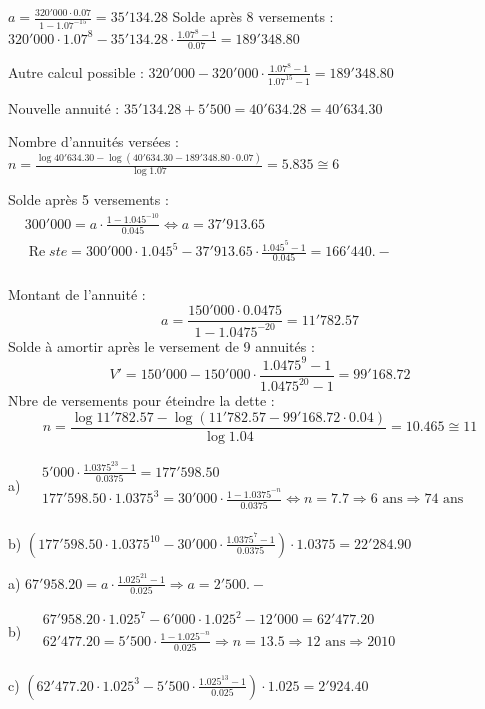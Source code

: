\begin{solution}
$a=\frac{320'000\cdot 0.07}{1-{{1.07}^{-15}}}=35'134.28$
		Solde après 8 versements : $320'000\cdot {{1.07}^{8}}-35'134.28\cdot \frac{{{1.07}^{8}}-1}{0.07}=189'348.80$
		
Autre calcul possible : $320'000-320'000\cdot \frac{{{1.07}^{8}}-1}{{{1.07}^{15}}-1}=189'348.80$
		
Nouvelle annuité : $35'134.28+5'500=40'634.28=40'634.30$
		
Nombre d’annuités versées : 
$n=\frac{\log 40'634.30-\log \left( 40'634.30-189'348.80\cdot 0.07 \right)}{\log 1.07}=5.835\cong 6$
\end{solution}

\begin{solution}
Solde après 5 versements : $\begin{array}{ll}
  & 300'000=a\cdot \frac{1-{{1.045}^{-10}}}{0.045}\Leftrightarrow a=37'913.65 \\ 
 & \operatorname{Re}ste=300'000\cdot {{1.045}^{5}}-37'913.65\cdot \frac{{{1.045}^{5}}-1}{0.045}=166'440.- \\ 
\end{array}$
\end{solution}

\begin{solution}
Montant de l’annuité : \[a=\frac{150'000\cdot 0.0475}{1-{{1.0475}^{-20}}}=11'782.57\]
Solde à amortir après le versement de 9 annuités : \[{V}'=150'000-150'000\cdot \frac{{{1.0475}^{9}}-1}{{{1.0475}^{20}}-1}=99'168.72\]
Nbre de versements pour éteindre la dette : \[n=\frac{\log 11'782.57-\log \left( 11'782.57-99'168.72\cdot 0.04 \right)}{\log 1.04}=10.465\cong 11\]
\end{solution}

\begin{solution}
a)	$\begin{array}{ll}
  & 5'000\cdot \frac{{{1.0375}^{23}}-1}{0.0375}=177'598.50 \\ 
 & 177'598.50\cdot {{1.0375}^{3}}=30'000\cdot \frac{1-{{1.0375}^{-n}}}{0.0375}\Leftrightarrow n=7.7\Rightarrow 6\text{ ans}\Rightarrow \text{74 ans} \\ 
\end{array}$

b) 	$\left( 177'598.50\cdot {{1.0375}^{10}}-30'000\cdot \frac{{{1.0375}^{7}}-1}{0.0375} \right)\cdot 1.0375=22'284.90$
\end{solution}

\begin{solution}
a)	$67'958.20=a\cdot \frac{{{1.025}^{21}}-1}{0.025}\Rightarrow a=2'500.-$

b)	$\begin{array}{ll}
  & 67'958.20\cdot {{1.025}^{7}}-6'000\cdot {{1.025}^{2}}-12'000=62'477.20 \\ 
 & 62'477.20=5'500\cdot \frac{1-{{1.025}^{-n}}}{0.025}\Rightarrow n=13.5\Rightarrow 12\text{ ans}\Rightarrow \text{2010} \\ 
\end{array}$

c)	$\left( 62'477.20\cdot {{1.025}^{3}}-5'500\cdot \frac{{{1.025}^{13}}-1}{0.025} \right)\cdot 1.025=2'924.40$
\end{solution}

